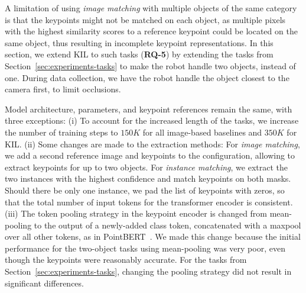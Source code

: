 \documentclass[letterpaper, 10 pt, conference]{ieeeconf}  %
\newif\ifappendixincluded
\newcommand{\appendixnote}[1]{\ifappendixincluded#1\fi}
\begin{document}
A limitation of using \textit{image matching} with multiple objects of the same category is that the keypoints might not be matched on each object, as multiple pixels with the highest similarity scores to a reference keypoint could be located on the same object, thus resulting in incomplete keypoint representations.
In this section, we extend KIL to such tasks (\textbf{RQ-5}) by extending the tasks from Section~\ref{sec:experiments-tasks} to make the robot handle two objects, instead of one.
During data collection, we have the robot handle the object closest to the camera first, to limit occlusions.

Model architecture, parameters, and keypoint references remain the same, with three exceptions:
(i) To account for the increased length of the tasks, we increase the number of training steps to $150K$ for all image-based baselines and $350K$ for KIL. %
(ii) Some changes are made to the extraction methods: For \textit{image matching}, we add a second reference image and keypoints to the configuration, allowing to extract keypoints for up to two objects. For \textit{instance matching}, we extract the two instances with the highest confidence and match keypoints on both masks. Should there be only one instance, we pad the list of keypoints with zeros, so that the total number of input tokens for the transformer encoder is consistent.
(iii) The token pooling strategy in the keypoint encoder is changed from mean-pooling to the output of a newly-added class token, concatenated with a maxpool over all other tokens, as in PointBERT~\cite{yu2022point-bert}. We made this change because the initial performance for the two-object tasks using mean-pooling was very poor, even though the keypoints were reasonably accurate. For the tasks from Section~\ref{sec:experiments-tasks}, changing the pooling strategy did not result in significant differences. \appendixnote{Our experiment with different pooling strategies is reported in Appendix~\ref{sec:appendix-additional-experiments-token-pooling}.}
\end{document}
